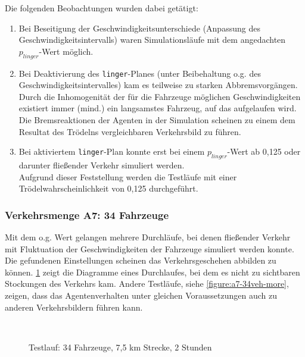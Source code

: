 Die folgenden Beobachtungen wurden dabei getätigt:
\begin{enumerate}
	\itemsep0em
	\item Bei Beseitigung der Geschwindigkeitsunterschiede (Anpassung des Geschwindigkeitsintervalls) waren Simulationsläufe mit dem angedachten $p_{linger}$-Wert möglich.
	\item Bei Deaktivierung des \texttt{linger}-Planes (unter Beibehaltung o.g. des Geschwindigkeitsintervalles) kam es teilweise zu starken Abbremsvorgängen.
	\\
	Durch die Inhomogenität der für die Fahrzeuge möglichen Geschwindigkeiten existiert immer (mind.) ein langsamstes Fahrzeug, auf das aufgelaufen wird.
Die Bremsreaktionen der Agenten in der Simulation scheinen zu einem dem Resultat des Trödelns vergleichbaren Verkehrsbild zu führen.
	\item Bei aktiviertem \texttt{linger}-Plan konnte erst bei einem $p_{linger}$-Wert ab 0,125 oder darunter fließender Verkehr simuliert werden.
	\\
	Aufgrund dieser Feststellung werden die Testläufe mit einer Trödelwahrscheinlichkeit von 0,125 durchgeführt.
\end{enumerate}



\subsubsection{Verkehrsmenge A7: 34 Fahrzeuge}
\label{sec:szenario-a7}

Mit dem o.g. Wert gelangen mehrere Durchläufe, bei denen fließender Verkehr mit Fluktuation der Geschwindigkeiten der Fahrzeuge simuliert werden konnte.
Die gefundenen Einstellungen scheinen das Verkehrsgeschehen abbilden zu können.
\cref{figure:testrun-34veh-7ko5km} zeigt die Diagramme eines Durchlaufes, bei dem es nicht zu sichtbaren Stockungen des Verkehrs kam.
Andere Testläufe, siehe \cref{figure:a7-34veh-more}, zeigen, dass das Agentenverhalten unter gleichen Voraussetzungen auch zu anderen Verkehrsbildern führen kann.%

\begin{figure}[hptb]
  \centering 
    \\
  \caption{Testlauf: 34 Fahrzeuge, 7,5 km Strecke, 2 Stunden} 
  \label{figure:testrun-34veh-7ko5km}
\end{figure}

